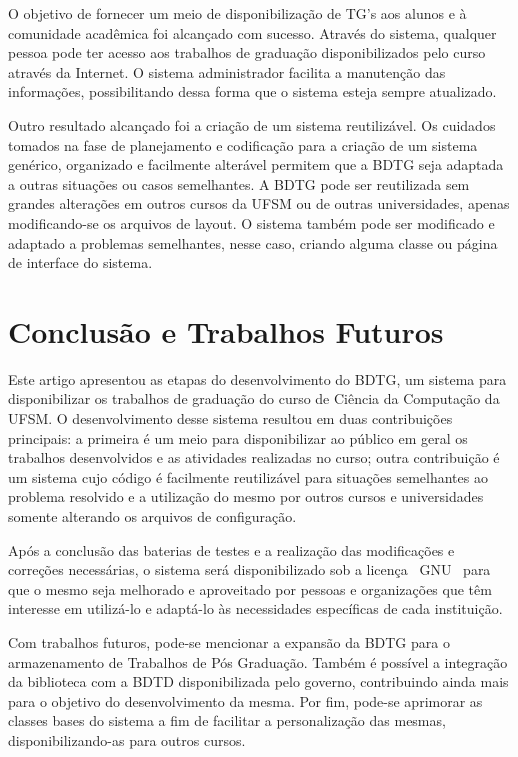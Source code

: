 \documentclass[12pt]{article}
\begin{document}
O objetivo de fornecer um meio de disponibiliza\c{c}\~{a}o de TG's aos alunos e \`{a} comunidade acad\^{e}mica foi alcan\c{c}ado com sucesso. Atrav\'{e}s do sistema, qualquer pessoa pode ter acesso aos trabalhos de gradua\c{c}\~{a}o disponibilizados pelo curso atrav\'{e}s da Internet. O sistema administrador facilita a manuten\c{c}\~{a}o das informa\c{c}\~{o}es, possibilitando dessa forma que o sistema esteja sempre atualizado.

Outro resultado alcan\c{c}ado foi a cria\c{c}\~{a}o de um sistema  reutiliz\'{a}vel. Os cuidados tomados na fase de planejamento e codifica\c{c}\~{a}o para a cria\c{c}\~{a}o de um sistema gen\'{e}rico, organizado e facilmente alter\'{a}vel permitem que a BDTG seja adaptada a outras situa\c{c}\~{o}es ou casos semelhantes. A BDTG pode ser reutilizada sem grandes altera\c{c}\~{o}es em outros cursos da UFSM ou de outras universidades, apenas modificando-se os arquivos de layout. O sistema tamb\'{e}m pode ser modificado e adaptado a problemas semelhantes, nesse caso, criando alguma classe ou p\'{a}gina de interface do sistema.


\section{Conclus\~{a}o e Trabalhos Futuros}
Este artigo apresentou as etapas do desenvolvimento do BDTG, um sistema para disponibilizar os trabalhos de gradua\c{c}\~{a}o do curso de Ci\^{e}ncia da Computa\c{c}\~{a}o da UFSM. O desenvolvimento desse sistema resultou em duas contribui\c{c}\~{o}es principais: a primeira \'{e} um meio para disponibilizar ao p\'{u}blico em geral os trabalhos desenvolvidos e as atividades realizadas no curso; outra contribui\c{c}\~{a}o \'{e} um sistema cujo c\'{o}digo \'{e} facilmente reutiliz\'{a}vel para situa\c{c}\~{o}es semelhantes ao problema resolvido e a utiliza\c{c}\~{a}o do mesmo por outros cursos e universidades somente alterando os arquivos de configura\c{c}\~{a}o.

Ap\'{o}s a conclus\~{a}o das baterias de testes e a realiza\c{c}\~{a}o das modifica\c{c}\~{o}es e corre\c{c}\~{o}es necess\'{a}rias, o sistema ser\'{a} disponibilizado sob a licen\c{c}a~\nocite{fsf} GNU~\cite{gnu} para que o mesmo seja melhorado e aproveitado por pessoas e organiza\c{c}\~{o}es que t\^{e}m interesse em utiliz\'{a}-lo e adapt\'{a}-lo \`{a}s necessidades espec\'{i}ficas de cada institui\c{c}\~{a}o.

Com trabalhos futuros, pode-se mencionar a expans\~{a}o da BDTG para o armazenamento de Trabalhos de P\'{o}s Gradua\c{c}\~{a}o. Tamb\'{e}m \'{e} poss\'{i}vel a integra\c{c}\~{a}o da biblioteca com a BDTD disponibilizada pelo governo, contribuindo ainda mais para o objetivo do desenvolvimento da mesma. Por fim, pode-se aprimorar as classes bases do sistema a fim de facilitar a personaliza\c{c}\~{a}o das mesmas, disponibilizando-as para outros cursos.



\end{document}
